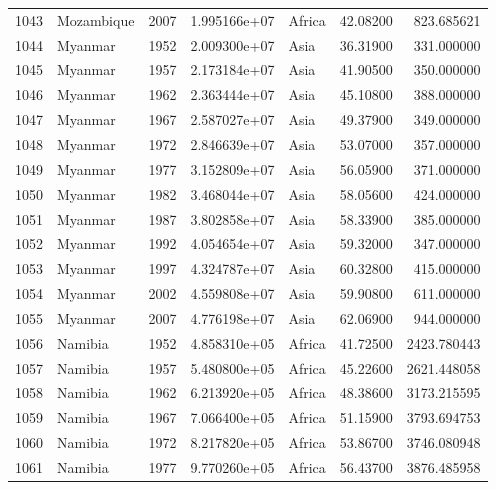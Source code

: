\documentclass[
  letterpaper,
  DIV=11,
  numbers=noendperiod]{scrreprt}
\begin{document}
\begin{tabular}{llrrlrr}
1043 &                Mozambique &  2007 &  1.995166e+07 &    Africa &  42.08200 &     823.685621 \\
1044 &                   Myanmar &  1952 &  2.009300e+07 &      Asia &  36.31900 &     331.000000 \\
1045 &                   Myanmar &  1957 &  2.173184e+07 &      Asia &  41.90500 &     350.000000 \\
1046 &                   Myanmar &  1962 &  2.363444e+07 &      Asia &  45.10800 &     388.000000 \\
1047 &                   Myanmar &  1967 &  2.587027e+07 &      Asia &  49.37900 &     349.000000 \\
1048 &                   Myanmar &  1972 &  2.846639e+07 &      Asia &  53.07000 &     357.000000 \\
1049 &                   Myanmar &  1977 &  3.152809e+07 &      Asia &  56.05900 &     371.000000 \\
1050 &                   Myanmar &  1982 &  3.468044e+07 &      Asia &  58.05600 &     424.000000 \\
1051 &                   Myanmar &  1987 &  3.802858e+07 &      Asia &  58.33900 &     385.000000 \\
1052 &                   Myanmar &  1992 &  4.054654e+07 &      Asia &  59.32000 &     347.000000 \\
1053 &                   Myanmar &  1997 &  4.324787e+07 &      Asia &  60.32800 &     415.000000 \\
1054 &                   Myanmar &  2002 &  4.559808e+07 &      Asia &  59.90800 &     611.000000 \\
1055 &                   Myanmar &  2007 &  4.776198e+07 &      Asia &  62.06900 &     944.000000 \\
1056 &                   Namibia &  1952 &  4.858310e+05 &    Africa &  41.72500 &    2423.780443 \\
1057 &                   Namibia &  1957 &  5.480800e+05 &    Africa &  45.22600 &    2621.448058 \\
1058 &                   Namibia &  1962 &  6.213920e+05 &    Africa &  48.38600 &    3173.215595 \\
1059 &                   Namibia &  1967 &  7.066400e+05 &    Africa &  51.15900 &    3793.694753 \\
1060 &                   Namibia &  1972 &  8.217820e+05 &    Africa &  53.86700 &    3746.080948 \\
1061 &                   Namibia &  1977 &  9.770260e+05 &    Africa &  56.43700 &    3876.485958 \\

\end{tabular}
\end{document}
